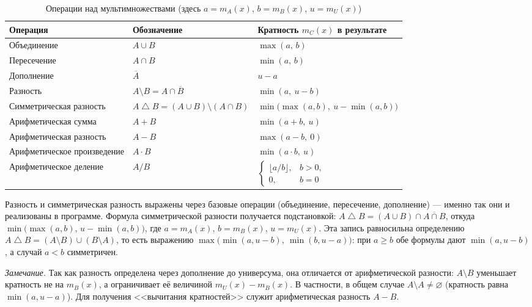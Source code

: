 \documentclass[14pt,a4paper]{extarticle}
\newcommand{\mult}[2]{m_{#1}(#2)}
\newcommand{\bigtri}{\mathbin{\triangle}}
\begin{document}
\begin{table}[H]
\caption{Операции над мультимножествами (здесь $a=\mult{A}{x}$, $b=\mult{B}{x}$, $u=\mult{U}{x}$)}\label{tab:ops}
\small\singlespacing
\begin{tabularx}{\textwidth}{@{}>{\raggedright\arraybackslash}p{3.7cm}>{\raggedright\arraybackslash}p{4.2cm}X@{}}
\toprule
Операция & Обозначение & Кратность $\mult{C}{x}$ в результате \\
\midrule
Объединение & $A\cup B$ & $\max(a,\,b)$ \\[3pt]
Пересечение & $A\cap B$ & $\min(a,\,b)$ \\[3pt]
Дополнение & $\overline{A}$ & $u-a$ \\[3pt]
Разность & $A\setminus B=A\cap\overline{B}$ & $\min(a,\ u-b)$ \\[3pt]
Симметрическая разность & $A\bigtri B=(A\cup B)\setminus(A\cap B)$ & $\min\bigl(\max(a,b),\ u-\min(a,b)\bigr)$ \\[3pt]
Арифметическая сумма & $A+B$ & $\min(a+b,\ u)$ \\[3pt]
Арифметическая разность & $A-B$ & $\max(a-b,\ 0)$ \\[3pt]
Арифметическое произведение & $A\cdot B$ & $\min(a\cdot b,\ u)$ \\[3pt]
Арифметическое деление & $A/B$ &
$\begin{cases}\lfloor a/b\rfloor, & b>0,\\ 0, & b=0\end{cases}$ \\
\bottomrule
\end{tabularx}
\end{table}

Разность и симметрическая разность выражены через базовые операции (объединение, пересечение, дополнение) --- именно так они и реализованы в программе. Формула симметрической разности получается подстановкой: $A\bigtri B=(A\cup B)\cap\overline{A\cap B}$, откуда
$\min\bigl(\max(a,b),\,u-\min(a,b)\bigr)$, где $a=\mult{A}{x}$, $b=\mult{B}{x}$, $u=\mult{U}{x}$. Эта запись равносильна определению $A\bigtri B=(A\setminus B)\cup(B\setminus A)$, то есть выражению $\max\bigl(\min(a,u-b),\ \min(b,u-a)\bigr)$: при $a\ge b$ обе формулы дают $\min(a,u-b)$, а случай $a<b$ симметричен.

\textit{Замечание.} Так как разность определена через дополнение до универсума, она отличается от арифметической разности: $A\setminus B$ уменьшает кратность не на $\mult{B}{x}$, а ограничивает её величиной $\mult{U}{x}-\mult{B}{x}$. В частности, в общем случае $A\setminus A\ne\varnothing$ (кратность равна $\min(a,u-a)$). Для получения <<вычитания кратностей>> служит арифметическая разность $A-B$.
\end{document}
